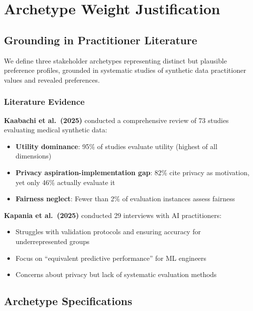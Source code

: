 \documentclass[12pt,a4paper]{article}
\begin{document}
\newpage
\appendix
\section{Archetype Weight Justification}

\subsection{Grounding in Practitioner Literature}

We define three stakeholder archetypes representing distinct but plausible preference profiles, grounded in systematic studies of synthetic data practitioner values and revealed preferences.

\subsubsection{Literature Evidence}

\textbf{Kaabachi et al.\ (2025)} conducted a comprehensive review of 73 studies evaluating medical synthetic data:
\begin{itemize}
    \item \textbf{Utility dominance}: 95\% of studies evaluate utility (highest of all dimensions)
    \item \textbf{Privacy aspiration-implementation gap}: 82\% cite privacy as motivation, yet only 46\% actually evaluate it
    \item \textbf{Fairness neglect}: Fewer than 2\% of evaluation instances assess fairness
\end{itemize}

\textbf{Kapania et al.\ (2025)} conducted 29 interviews with AI practitioners:
\begin{itemize}
    \item Struggles with validation protocols and ensuring accuracy for underrepresented groups
    \item Focus on ``equivalent predictive performance'' for ML engineers
    \item Concerns about privacy but lack of systematic evaluation methods
\end{itemize}

\subsection{Archetype Specifications}
\end{document}
